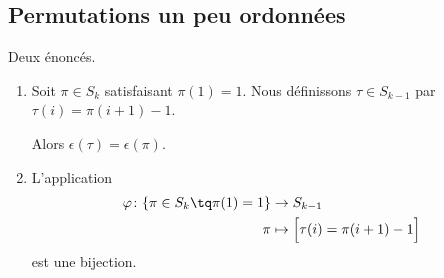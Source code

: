\subsection{Permutations un peu ordonnées}

\begin{lemma}		\label{LEMooEOTGooPslULz}
	Deux énoncés.
	\begin{enumerate}
		\item		\label{ITEMooQZDRooUYjcgX}
		      Soit \( \pi\in S_k\) satisfaisant \( \pi(1)=1\). Nous définissons \( \tau\in S_{k-1}\) par \( \tau(i)=\pi(i+1)-1 \).

		      Alors \( \epsilon(\tau)=\epsilon(\pi)\).
		\item		\label{ITEMooBUGZooVCVhKz}
		      L'application
		      \begin{equation}
			      \begin{aligned}
				      \varphi\colon \{ \pi\in S_k\tq \pi(1)=1 \} & \to S_{k-1}                             \\
				      \pi                                        & \mapsto \Big[  \tau(i)=\pi(i+1)-1 \Big]
			      \end{aligned}
		      \end{equation}
		      est une bijection.
	\end{enumerate}
\end{lemma}

